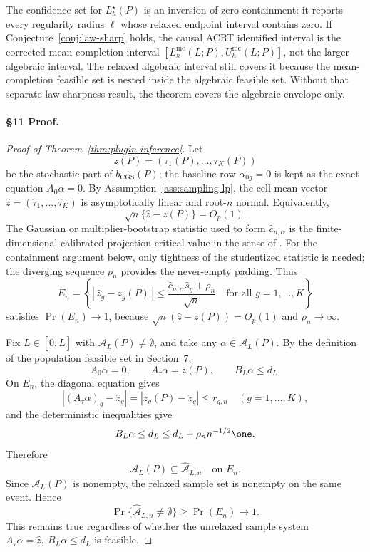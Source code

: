 The confidence set for \(L_h^\star(P)\) is an inversion of zero-containment:
it reports every regularity radius \(\ell\) whose relaxed endpoint interval
contains zero.  If Conjecture~\ref{conj:law-sharp} holds, the causal ACRT
identified interval is the corrected mean-completion interval
\([L_h^{\mathrm{mc}}(L;P),U_h^{\mathrm{mc}}(L;P)]\), not the larger algebraic
interval.  The relaxed algebraic interval still covers it because the
mean-completion feasible set is nested inside the algebraic feasible set.
Without that separate law-sharpness result, the theorem covers the algebraic
envelope only.

\paragraph{\S11 Proof.}
\begin{proof}[Proof of Theorem~\ref{thm:plugin-inference}]
Let
\[
  z(P)=(\tau_1(P),\ldots,\tau_K(P))
\]
be the stochastic part of \(b_{\mathrm{CGS}}(P)\); the baseline row
\(\alpha_{0g}=0\) is kept as the exact equation \(A_0\alpha=0\).  By
Assumption~\ref{ass:sampling-lp}, the cell-mean vector
\(\widehat z=(\widehat\tau_1,\ldots,\widehat\tau_K)\) is asymptotically
linear and root-\(n\) normal.  Equivalently,
\[
  \sqrt n\{\widehat z-z(P)\}=O_p(1).
\]
The Gaussian or multiplier-bootstrap statistic used to form
\(\widehat c_{n,\alpha}\) is the finite-dimensional calibrated-projection
critical value in the sense of \cite{KaidoMolinariStoye2019}.  For the
containment argument below, only tightness of the studentized statistic is
needed; the diverging sequence \(\rho_n\) provides the never-empty padding.
Thus
\[
  E_n=
  \left\{
    |\,\widehat z_g-z_g(P)\,|
    \le
    \frac{\widehat c_{n,\alpha}\widehat s_g+\rho_n}{\sqrt n}
    \quad\text{for all }g=1,\ldots,K
  \right\}
\]
satisfies \(\Pr(E_n)\to1\), because \(\sqrt n(\widehat z-z(P))=O_p(1)\) and
\(\rho_n\to\infty\).

Fix \(L\in[0,\bar L]\) with \(\mathcal A_L(P)\ne\emptyset\), and take any
\(\alpha\in\mathcal A_L(P)\).  By the definition of the population feasible
set in Section~7,
\[
  A_0\alpha=0,\qquad A_\tau\alpha=z(P),\qquad B_L\alpha\le d_L .
\]
On \(E_n\), the diagonal equation gives
\[
  |(A_\tau\alpha)_g-\widehat z_g|
  =
  |z_g(P)-\widehat z_g|
  \le r_{g,n}
  \quad(g=1,\ldots,K),
\]
and the deterministic inequalities give
\[
  B_L\alpha\le d_L\le d_L+\rho_n n^{-1/2}\one .
\]
Therefore
\[
  \mathcal A_L(P)\subseteq \widehat{\mathcal A}_{L,n}
  \quad\text{on }E_n .
\]
Since \(\mathcal A_L(P)\) is nonempty, the relaxed sample set is nonempty on
the same event.  Hence
\[
  \Pr\{\widehat{\mathcal A}_{L,n}\ne\emptyset\}\ge \Pr(E_n)\to1 .
\]
This remains true regardless of whether the unrelaxed sample system
\(A_\tau\alpha=\widehat z,\ B_L\alpha\le d_L\) is feasible.


\end{proof}
